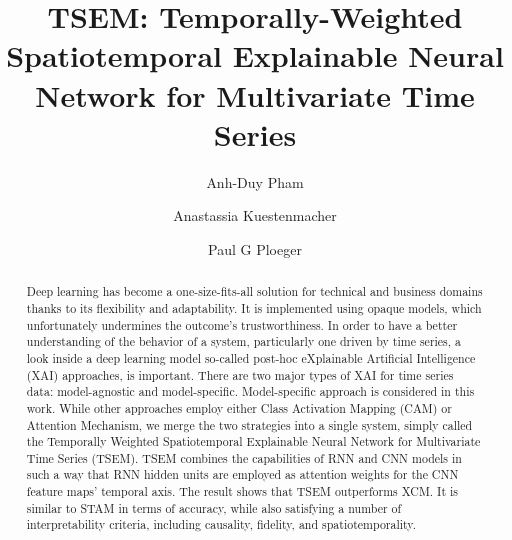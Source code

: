 \documentclass{svproc}
\begin{document}
\mainmatter              \title{TSEM: Temporally-Weighted Spatiotemporal Explainable Neural Network for Multivariate Time Series}
  \author{Anh-Duy Pham \and Anastassia Kuestenmacher
 \and
Paul G Ploeger }
 

\maketitle              

\begin{abstract}
Deep learning has become a one-size-fits-all solution for technical and business domains thanks to its flexibility and adaptability. It is implemented using opaque models, which unfortunately undermines the outcome's trustworthiness. In order to have a better understanding of the behavior of a system, particularly one driven by time series, a look inside a deep learning model so-called post-hoc eXplainable Artificial Intelligence (XAI) approaches, is important. There are two major types of XAI for time series data: model-agnostic and model-specific. Model-specific approach is considered in this work. While other approaches employ either Class Activation Mapping (CAM) or Attention Mechanism, we merge the two strategies into a single system, simply called the Temporally Weighted Spatiotemporal Explainable Neural Network for Multivariate Time Series (TSEM). TSEM combines the capabilities of RNN and CNN models in such a way that RNN hidden units are employed as attention weights for the CNN feature maps' temporal axis. The result shows that TSEM outperforms XCM. It is similar to STAM in terms of accuracy, while also satisfying a number of interpretability criteria, including causality, fidelity, and spatiotemporality.
\end{abstract}
\end{document}
